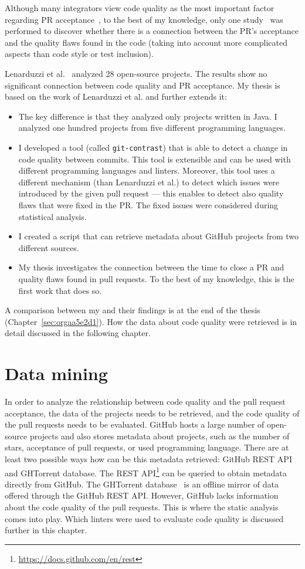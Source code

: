 \documentclass[digital,oneside,oldtable,nolof,nolot,nocover]{fithesis4}
\begin{document}
Although many integrators view code quality as the most important factor
regarding PR acceptance~\cite{integrator}, to the best of my knowledge, only
one study~\cite{quality} was performed to discover whether there is a
connection between the PR's acceptance and the quality flaws found in the
code (taking into account more complicated aspects than code style or test
inclusion).

Lenarduzzi et al.~\cite{quality} analyzed 28 open-source projects. The results show
no significant connection between code quality and PR acceptance.
My thesis is based on the work of Lenarduzzi et al. and further extends it:
\begin{itemize}
\item The key difference is that they analyzed only projects written
in Java. I analyzed one hundred projects from five different programming languages.
\item I developed a tool (called \texttt{git-contrast}) that is able to detect a change in code quality between commits.
This tool is extensible and can be used with different programming languages and linters.
Moreover, this tool uses a different mechanism (than Lenarduzzi et al.) to detect which issues
were introduced by the given pull request --- this enables to detect also quality flaws that were fixed
in the PR. The fixed issues were considered during statistical analysis.
\item I created a script that can retrieve metadata about GitHub projects from two different sources.
\item My thesis investigates the connection between the time to close a PR and quality flaws found
in pull requests. To the best of my knowledge, this is the first work that does so.
\end{itemize}
A comparison between my and their findings is at the end of the thesis (Chapter~\ref{sec:orgaa5e2d1}).
How the data about code quality were retrieved is in detail discussed in the following chapter.
\chapter{Data mining}
\label{sec:org233848d}
In order to analyze the relationship between code quality and the pull request acceptance,
the data of the projects needs to be retrieved, and the
code quality of the pull requests needs to be evaluated.
GitHub hosts a large number of open-source projects and also stores metadata
about projects, such as the number of stars, acceptance of pull requests, or used programming language.
There are at least two possible ways how can be this metadata retrieved: GitHub REST API
and GHTorrent database. The REST API\footnote{\url{https://docs.github.com/en/rest}} can be queried to
obtain metadata directly from GitHub. The GHTorrent database~\cite{ghtorrent}
is an offline mirror of data offered through the GitHub REST API.
However, GitHub lacks information about the code quality of the pull requests.
This is where the static analysis comes into play. Which linters were used to evaluate code
quality is discussed further in this chapter.
\end{document}
